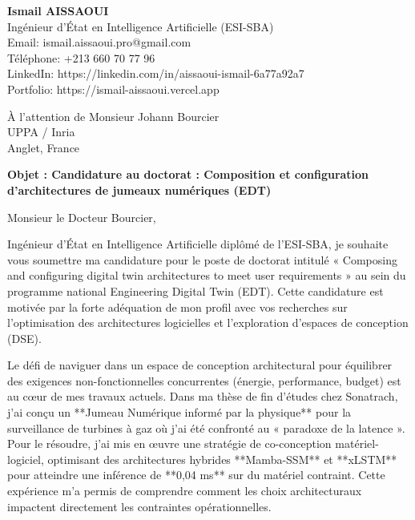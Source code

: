 \documentclass[a4paper,11pt]{letter}
\begin{document}
\begin{flushleft}
    \textbf{Ismail AISSAOUI} \\
    Ingénieur d'État en Intelligence Artificielle (ESI-SBA) \\
    Email: ismail.aissaoui.pro@gmail.com \\
    Téléphone: +213 660 70 77 96 \\
    LinkedIn: https://linkedin.com/in/aissaoui-ismail-6a77a92a7 \\
    Portfolio: https://ismail-aissaoui.vercel.app
\end{flushleft}

\bigskip

\begin{flushright}
    À l'attention de Monsieur Johann Bourcier \\
    UPPA / Inria \\
    Anglet, France
\end{flushright}

\bigskip

\begin{center}
    \textbf{Objet : Candidature au doctorat : Composition et configuration d'architectures de jumeaux numériques (EDT)}
\end{center}

\bigskip

Monsieur le Docteur Bourcier,

Ingénieur d'État en Intelligence Artificielle diplômé de l'ESI-SBA, je souhaite vous soumettre ma candidature pour le poste de doctorat intitulé « Composing and configuring digital twin architectures to meet user requirements » au sein du programme national Engineering Digital Twin (EDT). Cette candidature est motivée par la forte adéquation de mon profil avec vos recherches sur l'optimisation des architectures logicielles et l'exploration d'espaces de conception (DSE).

Le défi de naviguer dans un espace de conception architectural pour équilibrer des exigences non-fonctionnelles concurrentes (énergie, performance, budget) est au cœur de mes travaux actuels. Dans ma thèse de fin d'études chez Sonatrach, j'ai conçu un **Jumeau Numérique informé par la physique** pour la surveillance de turbines à gaz où j'ai été confronté au « paradoxe de la latence ». Pour le résoudre, j'ai mis en œuvre une stratégie de co-conception matériel-logiciel, optimisant des architectures hybrides **Mamba-SSM** et **xLSTM** pour atteindre une inférence de **0,04 ms** sur du matériel contraint. Cette expérience m'a permis de comprendre comment les choix architecturaux impactent directement les contraintes opérationnelles.
\end{document}
